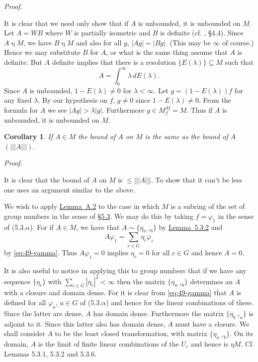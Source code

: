 \documentclass[b5paper,twoside]{article}
\newcommand{\secref}[2]{\hyperref[#1]{\mbox{\S#2}}}
\newcommand{\lemref}[2]{\hyperref[#1]{\mbox{Lemma~#2}}}
\theoremstyle{mvnplain}
\newtheorem*{corollary}{Corollary}
\renewenvironment{proof}[1][Proof]{%
  \par\addvspace{0.35\baselineskip}%
  \noindent\textit{#1.}\ \normalfont\ignorespaces
}{%
  \par\addvspace{0.35\baselineskip}%
}
\newcommand{\M}{\mathbf M}
\newcommand{\OpNorm}[1]{\left\lvert\left\lvert\left\lvert#1\right\rvert\right\rvert\right\rvert}
\def\M{M}%
\def\mathfrak#1{#1}%
\begin{document}
\begin{proof}
It is clear that we need only show that if $A$ is unbounded, it is unbounded
on $\mathfrak M$. Let $A=WB$ where $W$ is partially isometric and $B$ is
definite (cf. \cite{ref5}, \S4.4). Since $A\mathbin{\eta}\M$, we have
$B\mathbin{\eta}\M$ and also for all $g$, $|Ag|=|Bg|$. (This may be $\infty$
of course.) Hence we may substitute $B$ for $A$, or what is the same thing
assume that $A$ is definite. But $A$ definite implies that there is a
resolution $\{E(\lambda)\}\subseteq\M$ such that
\[
  A=\int_0^\infty\lambda\,dE(\lambda).
\]
Since $A$ is unbounded, $1-E(\lambda)\ne0$ for $\lambda<\infty$. Let
$g=(1-E(\lambda))f$ for any fixed $\lambda$. By our hypothesis on $f$,
$g\ne0$ since $1-E(\lambda)\ne0$. From the formula for $A$ we see
$|Ag|>\lambda|g|$. Furthermore $g\in\mathfrak M_f^{\M}=\mathfrak M$. Thus if
$A$ is unbounded, it is unbounded on $\mathfrak M$.
\end{proof}

\begin{corollary}\label{cor:A.2}
If $A\in\M$ the bound of $A$ on $\mathfrak M$ is the same as the bound of
$A$ $(\OpNorm{A})$.
\end{corollary}
\begin{proof}
It is clear that the bound of $A$ on $\mathfrak M$ is $\leq\OpNorm{A}$. To
show that it can't be less one uses an argument similar to the above.
\end{proof}

We wish to apply \lemref{lem:A.2}{A.2} to the case in which $\M$ is a subring
of the set of group numbers in the sense of \secref{sec:5.3}{5.3}. We may do
this by taking $f=\varphi_1$ in the sense of (5.3.$\alpha$). For if $A\in\M$,
we have that $A\sim\{\eta_{a^{-1}b}\}$ by \lemref{lem:5.3.2}{5.3.2} and
\[
  A\varphi_1=\sum_{c\in\mathfrak G}\eta_c\varphi_c
\]
by \eqref{eq:49-gamma}. Thus $A\varphi_1=0$ implies $\eta_c=0$ for all
$c\in\mathfrak G$ and hence $A=0$.

It is also useful to notice in applying this to group numbers that if we have
any sequence $\{\eta_c\}$ with $\sum_{c\in\mathfrak G}|\eta_c|^2<\infty$ then
the matrix $\{\eta_{a^{-1}b}\}$ determines an $A$ with a closure and domain
dense. For it is clear from \eqref{eq:49-gamma} that $A$ is defined for all
$\varphi_a$, $a\in\mathfrak G$ of (5.3.$\alpha$) and hence for the linear
combinations of these. Since the latter are dense, $A$ has domain dense.
Furthermore the matrix $\{\overline{\eta}_{b^{-1}a}\}$ is adjoint to it. Since
this latter also has domain dense, $A$ must have a closure. We shall consider
$A$ to be the least closed transformation, with matrix
$\{\eta_{a^{-1}b}\}$. On its domain, $A$ is the limit of finite linear
combinations of the $U_c$ and hence is $\mathbin{\eta}\M$. Cf. Lemmas 5.3.1,
5.3.2 and 5.3.6.
\end{document}
